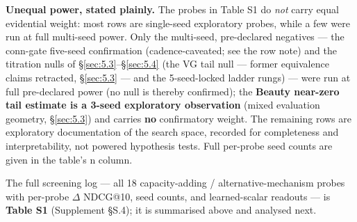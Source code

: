 \textbf{Unequal power, stated plainly.} The probes in Table S1 do \emph{not} carry equal evidential weight: most rows are single-seed exploratory probes, while a few were run at full multi-seed power. Only the multi-seed, pre-declared negatives --- the conn-gate five-seed confirmation (cadence-caveated; see the row note) and the titration nulls of \S\ref{sec:5.3}--\S\ref{sec:5.4} (the VG tail null --- former equivalence claims retracted, \S\ref{sec:5.3} --- and the 5-seed-locked ladder rungs) --- were run at full pre-declared power (no null is thereby confirmed); the \textbf{Beauty near-zero tail estimate is a 3-seed exploratory observation} (mixed evaluation geometry, \S\ref{sec:5.3}) and carries \textbf{no} confirmatory weight. The remaining rows are exploratory documentation of the search space, recorded for completeness and interpretability, not powered hypothesis tests. Full per-probe seed counts are given in the table's n column.


The full screening log --- all 18 capacity-adding / alternative-mechanism probes with per-probe \ensuremath{\Delta} NDCG@10, seed counts, and learned-scalar readouts --- is \textbf{Table S1} (Supplement \S{}S.4); it is summarised above and analysed next.


